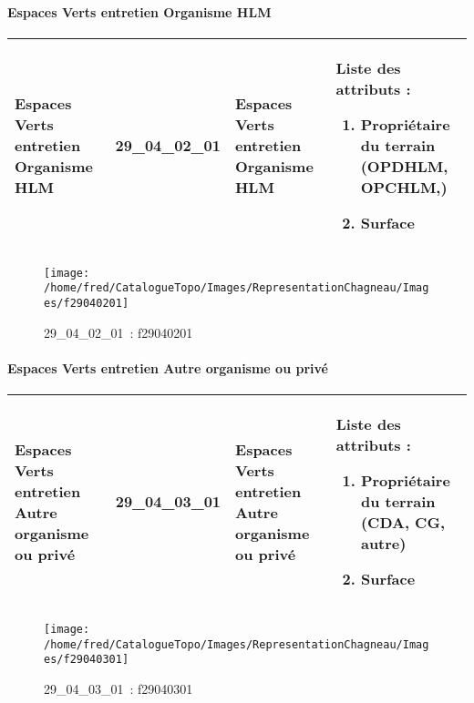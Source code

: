\documentclass[12pt,titlepage]{book}
\begin{document}
\paragraph{Espaces Verts entretien Organisme HLM}
\noindent
\vspace{\baselineskip}

\renewcommand{\arraystretch}{1.2}
\begin{supertabular}{|p{10cm}|c|p{13cm}|p{12cm}|}
 Espaces Verts entretien Organisme HLM & 29\_04\_02\_01 & Espaces Verts entretien Organisme HLM & Liste des attributs :
\begin{enumerate}
  \item Propriétaire du terrain (OPDHLM, OPCHLM,)  \item Surface\end{enumerate}
\\
\hline
\end{supertabular}
\begin{figure}[h!]
  \hfill         %
  \begin{minipage}[t]{3cm}
    \begin{center}
      \texttt{[image: /home/fred/CatalogueTopo/Images/RepresentationChagneau/Images/f29040201]}
      \caption[~29\_04\_02\_01]{\small{29\_04\_02\_01~:} \tiny{f29040201}}\label{f29040201}
    \end{center}
  \end{minipage}
\end{figure}


\paragraph{Espaces Verts entretien Autre organisme ou privé}
\noindent
\vspace{\baselineskip}

\renewcommand{\arraystretch}{1.2}
\begin{supertabular}{|p{10cm}|c|p{13cm}|p{12cm}|}
 Espaces Verts entretien Autre organisme ou privé & 29\_04\_03\_01 & Espaces Verts entretien Autre organisme ou privé & Liste des attributs :
\begin{enumerate}
  \item Propriétaire du terrain (CDA, CG, autre)  \item Surface\end{enumerate}
\\
\hline
\end{supertabular}
\begin{figure}[h!]
  \hfill         %
  \begin{minipage}[t]{3cm}
    \begin{center}
      \texttt{[image: /home/fred/CatalogueTopo/Images/RepresentationChagneau/Images/f29040301]}
      \caption[~29\_04\_03\_01]{\small{29\_04\_03\_01~:} \tiny{f29040301}}\label{f29040301}
    \end{center}
  \end{minipage}
\end{figure}
\end{document}
